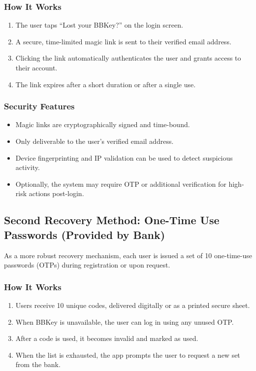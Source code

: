 \documentclass{article}[12pt]
\begin{document}
\subsubsection*{How It Works}
\begin{enumerate}
    \item The user taps “Lost your BBKey?” on the login screen.
    \item A secure, time-limited magic link is sent to their verified email address.
    \item Clicking the link automatically authenticates the user and grants access to their account.
    \item The link expires after a short duration or after a single use.
\end{enumerate}

\subsubsection*{Security Features}
\begin{itemize}
    \item Magic links are cryptographically signed and time-bound.
    \item Only deliverable to the user’s verified email address.
    \item Device fingerprinting and IP validation can be used to detect suspicious activity.
    \item Optionally, the system may require OTP or additional verification for high-risk actions post-login.
\end{itemize}

\subsection*{Second Recovery Method: One-Time Use Passwords (Provided by Bank)}
As a more robust recovery mechanism, each user is issued a set of 10 one-time-use passwords (OTPs) during registration or upon request.

\subsubsection*{How It Works}
\begin{enumerate}
    \item Users receive 10 unique codes, delivered digitally or as a printed secure sheet.
    \item When BBKey is unavailable, the user can log in using any unused OTP.
    \item After a code is used, it becomes invalid and marked as used.
    \item When the list is exhausted, the app prompts the user to request a new set from the bank.
\end{enumerate}
\end{document}
